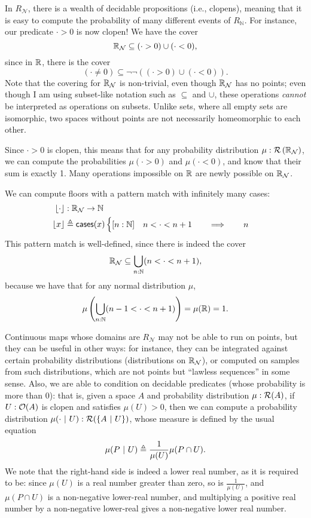 In $R_\mathcal{N}$, there is a wealth of decidable propositions (i.e., clopens), meaning that it is easy to compute the probability of many different events of $R_\mathbb{N}$. For instance, our predicate $\cdot > 0$ is now clopen! We have the cover
\[
\mathbb{R}_{\mathcal{N}} \subseteq (\cdot > 0) \cup (\cdot < 0),
\]
since in $\mathbb{R}$, there is the cover
\[
(\cdot \neq 0) \subseteq \neg \neg \left( (\cdot > 0) \cup (\cdot < 0) \right).
\]
Note that the covering for $\mathbb{R}_\mathcal{N}$ is non-trivial, even though $\mathbb{R}_\mathcal{N}$ has no points; even though I am using subset-like notation such as $\subseteq$ and $\cup$, these operations \emph{cannot} be interpreted as operations on subsets. Unlike sets, where all empty sets are isomorphic, two spaces without points are not necessarily homeomorphic to each other.

Since $\cdot > 0$ is clopen, this means that for any probability distribution $\mu : \mathcal{R}\left(\mathbb{R}_\mathcal{N}\right)$, we can compute the probabilities $\mu(\cdot > 0)$ and $\mu(\cdot < 0)$, and know that their sum is exactly 1. Many operations impossible on $\mathbb{R}$ are newly possible on $\mathbb{R}_\mathcal{N}$. 

We can compute floors with a pattern match with infinitely many cases:
\begin{align*}
\lfloor \cdot \rfloor &: \mathbb{R}_\mathcal{N} \to \mathbb{N}
\\ \lfloor x \rfloor &\triangleq \mathsf{cases}(x)
\begin{cases}
[n : \mathbb{N}] \quad n < \cdot < n + 1
  \qquad \Longrightarrow \qquad
  n
\end{cases}
\end{align*}
This pattern match is well-defined, since there is indeed the cover
\[
\mathbb{R}_\mathcal{N} \subseteq \bigcup_{n : \mathbb{N}} (n < \cdot < n + 1),
\]
because we have that for any normal distribution $\mu$,
\[
\mu \left( \bigcup_{n : \mathbb{N}} (n - 1 < \cdot < n + 1) \right) = \mu(\mathbb{R}) = 1.
\]

Continuous maps whose domains are $R_\mathcal{N}$ may not be able to run on points, but they can be useful in other ways: for instance, they can be integrated against certain probability distributions (distributions on $\mathbb{R}_\mathcal{N}$), or computed on samples from such distributions, which are not points but ``lawless sequences'' in some sense. Also, we are able to condition on decidable predicates (whose probability is more than 0): that is, given a space $A$ and probability distribution $\mu : \mathcal{R}(A)$, if $U : \mathcal{O}({A})$ is clopen and satisfies $\mu(U) > 0$, then we can compute a probability distribution $\mu(\cdot \ |\  U) : \mathcal{R}(\{A \ |\  U \})$, whose measure is defined by the usual equation
\[
\mu(P \ |\  U) \triangleq \frac{1}{\mu(U)} \mu(P \cap U).
\]
We note that the right-hand side is indeed a lower real number, as it is required to be: since $\mu(U)$ is a real number greater than zero, so is $\frac{1}{\mu(U)}$, and $\mu(P \cap U)$ is a non-negative lower-real number, and multiplying a positive real number by a non-negative lower-real gives a non-negative lower real number.

